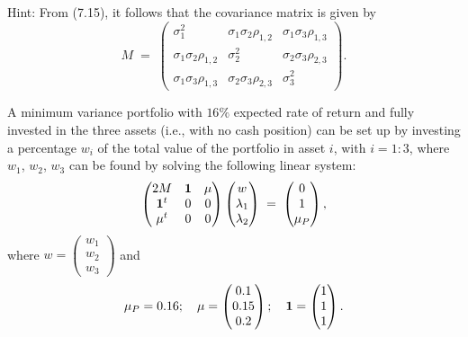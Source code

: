 \begin{exercises}
\begin{subparts}
\noindent Hint: From (7.15), it follows that the covariance matrix is given by
\[
M \;=\; \begin{pmatrix}
\sigma_1^2 & \sigma_1\sigma_2\rho_{1,2} & \sigma_1\sigma_3\rho_{1,3}\\
\sigma_1\sigma_2\rho_{1,2} & \sigma_2^2 & \sigma_2\sigma_3\rho_{2,3}\\
\sigma_1\sigma_3\rho_{1,3} & \sigma_2\sigma_3\rho_{2,3} & \sigma_3^2
\end{pmatrix}.
\]
\item A minimum variance portfolio with $16\%$ expected rate of return and fully
invested in the three assets (i.e., with no cash position) can be set up by
investing a percentage $w_i$ of the total value of the portfolio in asset $i$, with
$i=1:3$, where $w_1$, $w_2$, $w_3$ can be found by solving the following linear
system:
\begin{equation}
\begin{pmatrix} 2M & \mathbf{1} & \mu\\ \mathbf{1}^t & 0 & 0\\ \mu^t & 0 & 0\end{pmatrix}
\begin{pmatrix} w\\ \lambda_1\\ \lambda_2\end{pmatrix}
\;=\;
\begin{pmatrix} 0\\ 1\\ \mu_P\end{pmatrix},
\end{equation}
where $w = \begin{pmatrix} w_1\\ w_2\\ w_3\end{pmatrix}$ and
\[
\mu_P = 0.16; \quad
\mu = \begin{pmatrix} 0.1\\ 0.15\\ 0.2\end{pmatrix}; \quad
\mathbf{1} = \begin{pmatrix} 1\\ 1\\ 1\end{pmatrix}.
\]


\end{subparts}
\end{exercises}
